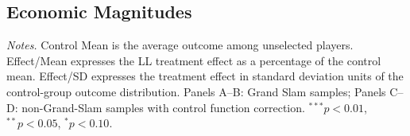 \subsection{Economic Magnitudes}
\label{app:economic_magnitudes}

\begin{table}[htbp]
\centering
\caption{Economic Magnitudes: Treatment Effects Relative to Control Means}
\label{tab:economic_magnitudes}
\begin{threeparttable}
\small

\begin{tablenotes}
\footnotesize
\item \textit{Notes.} Control Mean is the average outcome among unselected players. Effect/Mean expresses the LL treatment effect as a percentage of the control mean. Effect/SD expresses the treatment effect in standard deviation units of the control-group outcome distribution. Panels A--B: Grand Slam samples; Panels C--D: non-Grand-Slam samples with control function correction. $^{***}p<0.01$, $^{**}p<0.05$, $^{*}p<0.10$.
\end{tablenotes}
\end{threeparttable}
\end{table}
